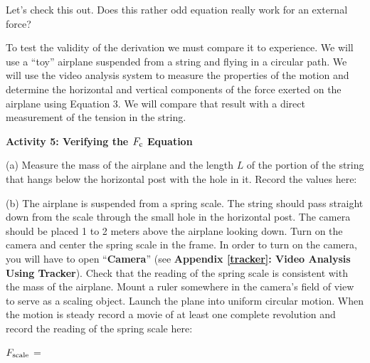 Let's check this out. Does this rather odd equation really work for an external
force?

To test the validity of the derivation we must compare it to experience. We
will use a ``toy'' airplane suspended from a string and flying
in a circular path. We will use the video analysis system to measure the properties
of the motion and determine the horizontal and vertical components of the force
exerted on the airplane using Equation 3. We will compare that result with a
direct measurement of the tension in the string. 

\textbf{Activity 5: Verifying the \(F_{\rm c} \) Equation }

(a) Measure the mass of the airplane and the length $L$ of the portion of the
string that hangs below the horizontal post with the hole in it. Record the
values here: 
\vspace{10mm}

(b) The airplane is suspended from a spring scale. The string should pass straight
down from the scale through the small hole in the horizontal post. The camera
should be placed 1 to 2 meters above the airplane looking down. Turn on the camera and center
the spring scale in the frame. In order to turn on the camera, you will have to open ``\textbf{Camera}'' (see \textbf{Appendix \ref{tracker}: Video Analysis Using Tracker}). Check that the reading of the spring
scale is consistent with the mass of the airplane. Mount a ruler somewhere in the
camera's field of view to serve as a scaling object. Launch the plane into uniform
circular motion. When the motion is steady record a movie of at least one complete
revolution and record the reading of the spring scale here:
\vspace{5mm}

\hspace{0.5in} \( F_{\rm scale} \) = 
\vspace{5mm}

